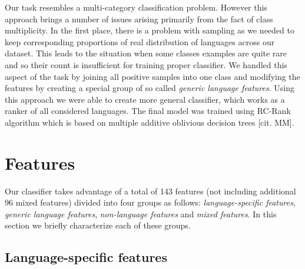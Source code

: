 \documentclass[12pt,a4paper]{article}     %
\begin{document}
  Our task resembles a multi-category classification problem. 
  However this approach brings a number of issues arising primarily from the fact of class multiplicity. 
  In the first place, there is a problem with sampling as we needed to keep corresponding proportions 
  of real distribution of languages across our dataset. 
  This leads to the situation when some classes examples are quite rare and so their count is insufficient 
  for training proper classifier. We handled this aspect of the task by joining all positive samples 
  into one class and modifying the features by creating a special group of so called \textit{generic language features}. 
  Using this approach we were able to create more general classifier, which works as a ranker of all considered languages. 
  The final model was trained using RC-Rank algorithm which is based on multiple additive oblivious decision trees [cit. MM]. 

  \section{Features}
  Our classifier takes advantage of a total of 143 features (not including additional 96 mixed features) divided into four groups
  as follows: \textit{language-specific features}, \textit{generic language features}, \textit{non-language
  features} and \textit{mixed features}. In this section we briefly characterize each of these
  groups.

  \subsection{Language-specific features}
\end{document}
